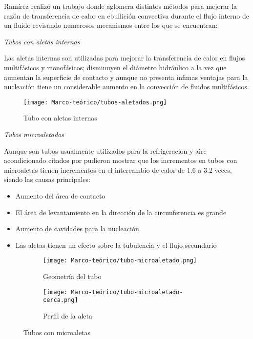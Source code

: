 				Ramírez \cite{ramirez_intensificacion_2018} realizó un trabajo donde aglomera distintos métodos para mejorar la razón de transferencia de calor en ebullición convectiva durante el flujo interno de un fluido revisando numerosos mecanismos entre los que se encuentran:

				\textit{Tubos con aletas internas}

				Las aletas internas son utilizadas para mejorar la transferencia de calor en flujos multifásicos y monofásicos; disminuyen el diámetro hidráulico a la vez que aumentan la superficie de contacto y aunque no presenta ínfimas ventajas para la nucleación tiene un considerable aumento en la convección de fluidos multifásicos.

				\begin{figure}[ht]
					\centering
					\texttt{[image: Marco-teórico/tubos-aletados.png]}
					\caption{Tubo con aletas internas}
					\label{fig:tubos-aletados}
				\end{figure}

				\textit{Tubos microaletados}

				Aunque son tubos usualmente utilizados para la refrigeración y aire acondicionado \cites{wang_single-phase_1996}{greco_convective_2008} citados por \cite{ramirez_intensificacion_2018} pudieron mostrar que los incrementos en tubos con microaletas tienen incrementos en el intercambio de calor de $1.6$ a $3.2$ veces, siendo las causas principales:

				\begin{itemize}[columns = 2]
					\item Aumento del área de contacto
					\item El área de levantamiento en la dirección de la circunferencia es grande
					\item Aumento de cavidades para la nucleación
					\item Las aletas tienen un efecto sobre la tubulencia y el flujo secundario
				\end{itemize}

				\begin{figure}[htb]
					\centering
					 \begin{subfigure}[H]{0.6\textwidth}
				         \centering
				         \texttt{[image: Marco-teórico/tubo-microaletado.png]}
				         \caption{Geometría del tubo}
				         \label{fig:tubo-microaletado}
				     \end{subfigure}
				     \hfill
				     \begin{subfigure}[H]{0.3\textwidth}
				         \centering
				         \texttt{[image: Marco-teórico/tubo-microaletado-cerca.png]}
				         \caption{Perfil de la aleta }
				         \label{fig:tubo-microaletado-cerca}
				     \end{subfigure}
					\caption{Tubos con microaletas}
					\label{fig:tubos-microaletados}
				\end{figure}

